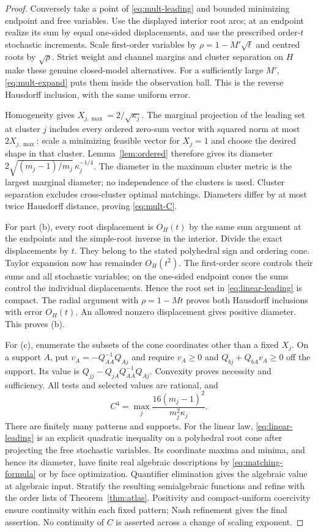 \begin{proof}
Conversely take a point of \eqref{eq:mult-leading} and bounded minimizing
endpoint and free variables. Use the displayed interior root arcs;
at an endpoint realize its sum by equal one-sided displacements, and
use the prescribed order-$t$ stochastic increments. Scale first-order
variables by $\rho=1-M'\sqrt t$ and centred roots by $\sqrt\rho$.
Strict weight and channel margins and cluster separation on $H$ make
these genuine closed-model alternatives. For a sufficiently large
$M'$, \eqref{eq:mult-expand} puts them inside the observation ball.
This is the reverse Hausdorff inclusion, with the same uniform error.

Homogeneity gives $X_{j,\max}=2/\sqrt{\kappa_j}$. The marginal projection
of the leading set at cluster $j$ includes every ordered zero-sum
vector with squared norm at most $2X_{j,\max}$: scale a minimizing
feasible vector for $X_j=1$ and choose the desired shape in that cluster.
Lemma~\ref{lem:ordered} therefore gives its diameter
$2\sqrt{(m_j-1)/m_j}\,\kappa_j^{-1/4}$. The diameter in the maximum
cluster metric is the largest marginal diameter; no independence of
the clusters is used. Cluster separation excludes cross-cluster optimal
matchings. Diameters differ by at most twice Hausdorff distance, proving
\eqref{eq:mult-C}.

For part (b), every root displacement is $O_H(t)$ by the same sum
argument at the endpoints and the simple-root inverse in the interior.
Divide the exact displacements by $t$. They belong to the stated
polyhedral sign and ordering cone. Taylor expansion now has remainder
$O_H(t^2)$. The first-order score controls their sums and all stochastic
variables; on the one-sided endpoint cones the sums control the
individual displacements. Hence the root set in \eqref{eq:linear-leading}
is compact. The radial argument with $\rho=1-Mt$ proves both Hausdorff
inclusions with error $O_H(t)$. An allowed nonzero displacement gives
positive diameter. This proves (b).

For (c), enumerate the subsets of the cone coordinates other than a
fixed $X_j$. On a support $A$, put
$v_A=-Q_{AA}^{-1}Q_{Aj}$ and require
$v_A\ge0$ and $Q_{bj}+Q_{bA}v_A\ge0$ off the support. Its value is
$Q_{jj}-Q_{jA}Q_{AA}^{-1}Q_{Aj}$. Convexity proves necessity and
sufficiency. All tests and selected values are rational, and
\[
 C^4=\max_j\frac{16(m_j-1)^2}{m_j^2\kappa_j}.
\]
There are finitely many patterns and supports. For the linear law,
\eqref{eq:linear-leading} is an explicit quadratic inequality on a
polyhedral root cone after projecting the free stochastic variables.
Its coordinate maxima and minima, and hence its diameter, have finite
real algebraic descriptions by \eqref{eq:matching-formula} or by face
optimization. Quantifier elimination gives the algebraic value at
algebraic input. Stratify the resulting semialgebraic functions and
refine with the order lists of Theorem~\ref{thm:atlas}. Positivity and
compact-uniform coercivity ensure continuity within each fixed pattern;
Nash refinement gives the final assertion. No continuity of $C$ is
asserted across a change of scaling exponent.
\end{proof}

